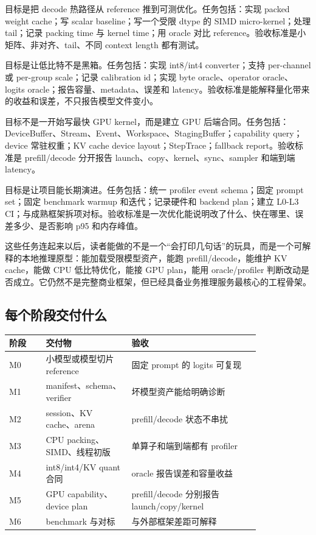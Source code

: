  目标是把 decode 热路径从 reference 推到可测优化。任务包括：实现 packed weight cache；写 scalar baseline；写一个受限 dtype 的 SIMD micro-kernel；处理 tail；记录 packing time 与 kernel time；用 oracle 对比 reference。验收标准是小矩阵、非对齐、tail、不同 context length 都有测试。

 目标是让低比特不是黑箱。任务包括：实现 int8/int4 converter；支持 per-channel 或 per-group scale；记录 calibration id；实现 byte oracle、operator oracle、logits oracle；报告容量、metadata、误差和 latency。验收标准是能解释量化带来的收益和误差，不只报告模型文件变小。

 目标不是一开始写最快 GPU kernel，而是建立 GPU 后端合同。任务包括：DeviceBuffer、Stream、Event、Workspace、StagingBuffer；capability query；device 常驻权重；KV cache device layout；StepTrace；fallback report。验收标准是 prefill/decode 分开报告 launch、copy、kernel、sync、sampler 和端到端 latency。

 目标是让项目能长期演进。任务包括：统一 profiler event schema；固定 prompt set；固定 benchmark warmup 和迭代；记录硬件和 backend plan；建立 L0-L3 CI；与成熟框架拆项对标。验收标准是一次优化能说明改了什么、快在哪里、误差多少、是否影响 p95 和内存峰值。

这些任务连起来以后，读者能做的不是一个“会打印几句话”的玩具，而是一个可解释的本地推理原型：能加载受限模型资产，能跑 prefill/decode，能维护 KV cache，能做 CPU 低比特优化，能接 GPU plan，能用 oracle/profiler 判断改动是否成立。它仍然不是完整商业框架，但已经具备业务推理服务最核心的工程骨架。

\subsection{每个阶段交付什么}

\begin{center}
\begin{tabular}{p{0.12\linewidth}p{0.28\linewidth}p{0.42\linewidth}}
\toprule
阶段 & 交付物 & 验收 \\
\midrule
M0 & 小模型或模型切片 reference & 固定 prompt 的 logits 可复现 \\
M1 & manifest、schema、verifier & 坏模型资产能给明确诊断 \\
M2 & session、KV cache、arena & prefill/decode 状态不串扰 \\
M3 & CPU packing、SIMD、线程初版 & 单算子和端到端都有 profiler \\
M4 & int8/int4/KV quant 合同 & oracle 报告误差和容量收益 \\
M5 & GPU capability、device plan & prefill/decode 分别报告 launch/copy/kernel \\
M6 & benchmark 与对标 & 与外部框架差距可解释 \\
\bottomrule
\end{tabular}
\end{center}


